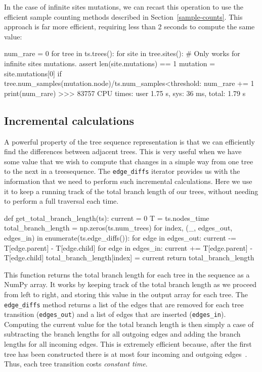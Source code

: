 \documentclass[graybox]{svmult}
\begin{document}
In the case of infinite sites mutations, we can recast this operation
to use the efficient sample counting methods described in
Section~\ref{sample-counts}. This approach is far more
efficient, requiring less than 2 seconds to compute the same value:
\begin{pythoncode}
num_rare = 0
for tree in ts.trees():
  for site in tree.sites():
    # Only works for infinite sites mutations.
    assert len(site.mutations) == 1
    mutation = site.mutations[0]
    if tree.num_samples(mutation.node)/ts.num_samples<threshold:
        num_rare += 1
print(num_rare)
>>> 83757
CPU times: user 1.75 s, sys: 36 ms, total: 1.79 s
\end{pythoncode}

\subsection{Incremental calculations}\label{incremental-calculations}

A powerful property of the tree sequence representation is that we can
efficiently find the differences between adjacent trees. This is very
useful when we have some value that we wish to compute that changes in a
simple way from one tree to the next in a treesequence. The \texttt{edge\_diffs} iterator provides us
with the information that we need to perform such incremental
calculations. Here we use it to keep a running track of the total branch
length of our trees, without needing to perform a full traversal each
time.

\begin{pythoncode}
def get_total_branch_length(ts):
    current = 0
    T = ts.nodes_time
    total_branch_length = np.zeros(ts.num_trees)
    for index, (_, edges_out, edges_in) in enumerate(ts.edge_diffs()):
        for edge in edges_out:
            current -= T[edge.parent] - T[edge.child]
        for edge in edges_in:
            current += T[edge.parent] - T[edge.child]
        total_branch_length[index] = current
    return total_branch_length
\end{pythoncode}

    This function returns the total branch length for each tree in the
sequence as a NumPy array. It works by keeping track of the total branch
length as we proceed from left to right, and storing this value in the
output array for each tree. The \texttt{edge\_diffs} method returns a
list of the edges that are removed for each tree transition
(\texttt{edges\_out}) and a list of edges that are inserted
(\texttt{edges\_in}). Computing the current value for the total branch
length is then simply a case of subtracting the branch lengths for all
outgoing edges and adding the branch lengths for all incoming edges.
This is extremely efficient because, after the first tree has been
constructed there is at most four incoming and outgoing
edges~\citep{kelleher2016efficient}. Thus,
each tree transition costs \emph{constant time}.
\end{document}

